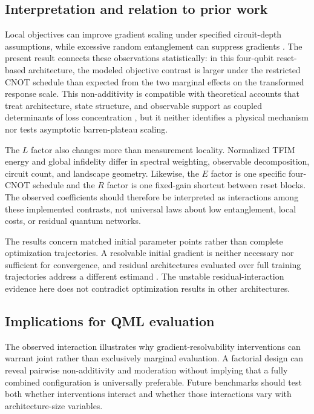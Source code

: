 \documentclass[pdflatex,sn-mathphys-num,Numbered]{sn-jnl}
\begin{document}
\subsection{Interpretation and relation to prior work}

Local objectives can improve gradient scaling under specified circuit-depth assumptions, while excessive random entanglement can suppress gradients \cite{cerezo2021costfunction,ortizmarrero2021entanglement,patti2021entanglement}. The present result connects these observations statistically: in this four-qubit reset-based architecture, the modeled objective contrast is larger under the restricted CNOT schedule than expected from the two marginal effects on the transformed response scale. This non-additivity is compatible with theoretical accounts that treat architecture, state structure, and observable support as coupled determinants of loss concentration \cite{ragone2024lie}, but it neither identifies a physical mechanism nor tests asymptotic barren-plateau scaling.

The $L$ factor also changes more than measurement locality. Normalized TFIM energy and global infidelity differ in spectral weighting, observable decomposition, circuit count, and landscape geometry. Likewise, the $E$ factor is one specific four-CNOT schedule and the $R$ factor is one fixed-gain shortcut between reset blocks. The observed coefficients should therefore be interpreted as interactions among these implemented contrasts, not universal laws about low entanglement, local costs, or residual quantum networks.

The results concern matched initial parameter points rather than complete optimization trajectories. A resolvable initial gradient is neither necessary nor sufficient for convergence, and residual architectures evaluated over full training trajectories address a different estimand \cite{anschuetz2022traps,grant2019identity,skolik2021layerwise,kashif2024resqnets}. The unstable residual-interaction evidence here does not contradict optimization results in other architectures.

\subsection{Implications for QML evaluation}

The observed interaction illustrates why gradient-resolvability interventions can warrant joint rather than exclusively marginal evaluation. A factorial design can reveal pairwise non-additivity and moderation without implying that a fully combined configuration is universally preferable. Future benchmarks should test both whether interventions interact and whether those interactions vary with architecture-size variables.
\end{document}
